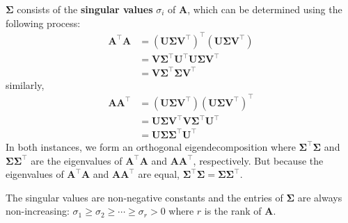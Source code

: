 \documentclass{article}
\begin{document}
\begin{multicols*}{3}
    \(\symbf{\Sigma}\) consists of the \textbf{singular values} \(\sigma_i\) of \(\symbf{A}\), which can be determined
    using the following process:
    \begin{align*}
        \symbf{A}^\top \symbf{A} & = \left( \symbf{U} \symbf{\Sigma} \symbf{V}^\top \right)^\top \left( \symbf{U} \symbf{\Sigma} \symbf{V}^\top \right) \\
                                 & = \symbf{V} \symbf{\Sigma}^\top \symbf{U}^\top \symbf{U} \symbf{\Sigma} \symbf{V}^\top                               \\
                                 & = \symbf{V} \symbf{\Sigma}^\top \symbf{\Sigma} \symbf{V}^\top
    \end{align*}
    similarly,
    \begin{align*}
        \symbf{A} \symbf{A}^\top & = \left( \symbf{U} \symbf{\Sigma} \symbf{V}^\top \right) \left( \symbf{U} \symbf{\Sigma} \symbf{V}^\top \right)^\top \\
                                 & = \symbf{U} \symbf{\Sigma} \symbf{V}^\top \symbf{V} \symbf{\Sigma}^\top \symbf{U}^\top                               \\
                                 & = \symbf{U} \symbf{\Sigma} \symbf{\Sigma}^\top \symbf{U}^\top
    \end{align*}
    In both instances, we form an orthogonal eigendecomposition where
    \(\symbf{\Sigma}^\top \symbf{\Sigma}\) and \(\symbf{\Sigma} \symbf{\Sigma}^\top\) are the eigenvalues of
    \(\symbf{A}^\top\symbf{A}\) and \(\symbf{A}\symbf{A}^\top\), respectively.
    But because the eigenvalues of \(\symbf{A}^\top\symbf{A}\) and \(\symbf{A}\symbf{A}^\top\)
    are equal, \(\symbf{\Sigma}^\top \symbf{\Sigma} = \symbf{\Sigma} \symbf{\Sigma}^\top\).

    The singular values are non-negative constants and the entries of \(\symbf{\Sigma}\)
    are always non-increasing: \(\sigma_1 \geq \sigma_2 \geq \cdots \geq \sigma_r > 0\)
    where \(r\) is the rank of \(\symbf{A}\).

\end{multicols*}
\end{document}
